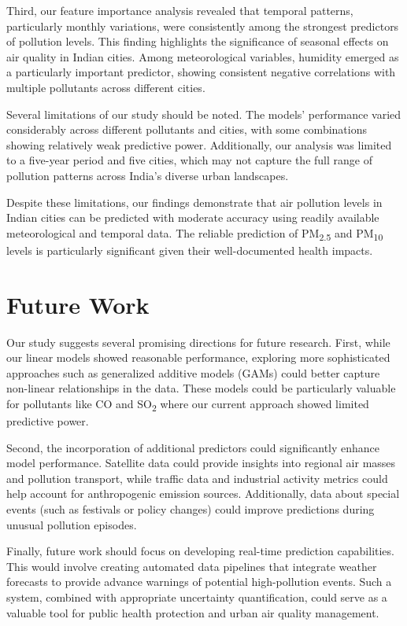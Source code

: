\documentclass[twoside,11pt]{article}
\begin{document}
Third, our feature importance analysis revealed that temporal patterns, particularly monthly variations, were consistently among the strongest predictors of pollution levels. This finding highlights the significance of seasonal effects on air quality in Indian cities. Among meteorological variables, humidity emerged as a particularly important predictor, showing consistent negative correlations with multiple pollutants across different cities.

Several limitations of our study should be noted. The models' performance varied considerably across different pollutants and cities, with some combinations showing relatively weak predictive power. Additionally, our analysis was limited to a five-year period and five cities, which may not capture the full range of pollution patterns across India's diverse urban landscapes.

Despite these limitations, our findings demonstrate that air pollution levels in Indian cities can be predicted with moderate accuracy using readily available meteorological and temporal data. The reliable prediction of PM\textsubscript{2.5} and PM\textsubscript{10} levels is particularly significant given their well-documented health impacts.


\section{Future Work}

Our study suggests several promising directions for future research. First, while our linear models showed reasonable performance, exploring more sophisticated approaches such as generalized additive models (GAMs) could better capture non-linear relationships in the data. These models could be particularly valuable for pollutants like CO and SO\textsubscript{2} where our current approach showed limited predictive power.

Second, the incorporation of additional predictors could significantly enhance model performance. Satellite data could provide insights into regional air masses and pollution transport, while traffic data and industrial activity metrics could help account for anthropogenic emission sources. Additionally, data about special events (such as festivals or policy changes) could improve predictions during unusual pollution episodes.

Finally, future work should focus on developing real-time prediction capabilities. This would involve creating automated data pipelines that integrate weather forecasts to provide advance warnings of potential high-pollution events. Such a system, combined with appropriate uncertainty quantification, could serve as a valuable tool for public health protection and urban air quality management.
\end{document}

